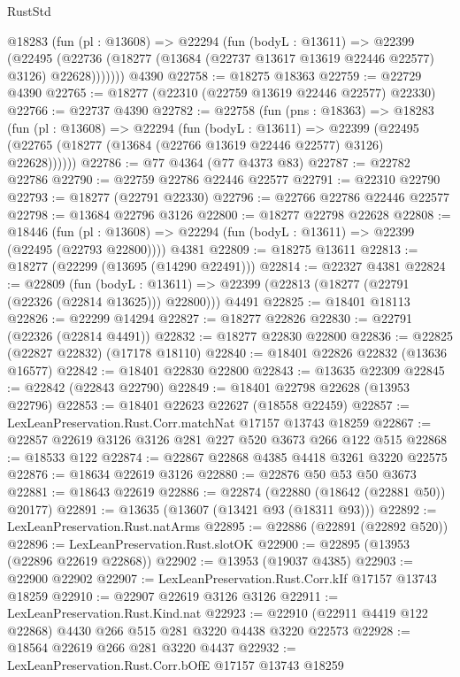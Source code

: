 \begin{lexlean}{RustStd}
\begin{coremodule}
      @18283
        (fun (pl : @13608) =>
        @22294
          (fun (bodyL : @13611) =>
          @22399
            (@22495
              (@22736 (@18277 (@13684 (@22737 @13617 @13619 @22446 @22577) @3126) @22628)))))))
    @4390
@22758 := @18275 @18363
@22759 := @22729 @4390
@22765 := @18277 (@22310 (@22759 @13619 @22446 @22577) @22330)
@22766 := @22737 @4390
@22782 := @22758
    (fun (pns : @18363) =>
    @18283
      (fun (pl : @13608) =>
      @22294
        (fun (bodyL : @13611) =>
        @22399 (@22495 (@22765 (@18277 (@13684 (@22766 @13619 @22446 @22577) @3126) @22628))))))
@22786 := @77 @4364 (@77 @4373 @83)
@22787 := @22782 @22786
@22790 := @22759 @22786 @22446 @22577
@22791 := @22310 @22790
@22793 := @18277 (@22791 @22330)
@22796 := @22766 @22786 @22446 @22577
@22798 := @13684 @22796 @3126
@22800 := @18277 @22798 @22628
@22808 := @18446
    (fun (pl : @13608) => @22294 (fun (bodyL : @13611) => @22399 (@22495 (@22793 @22800))))
    @4381
@22809 := @18275 @13611
@22813 := @18277 (@22299 (@13695 (@14290 @22491)))
@22814 := @22327 @4381
@22824 := @22809
    (fun (bodyL : @13611) => @22399 (@22813 (@18277 (@22791 (@22326 (@22814 @13625))) @22800)))
    @4491
@22825 := @18401 @18113
@22826 := @22299 @14294
@22827 := @18277 @22826
@22830 := @22791 (@22326 (@22814 @4491))
@22832 := @18277 @22830 @22800
@22836 := @22825 (@22827 @22832) (@17178 @18110)
@22840 := @18401 @22826 @22832 (@13636 @16577)
@22842 := @18401 @22830 @22800
@22843 := @13635 @22309
@22845 := @22842 (@22843 @22790)
@22849 := @18401 @22798 @22628 (@13953 @22796)
@22853 := @18401 @22623 @22627 (@18558 @22459)
@22857 := LexLeanPreservation.Rust.Corr.matchNat @17157 @13743 @18259
@22867 := @22857 @22619 @3126 @3126 @281 @227 @520 @3673 @266 @122 @515
@22868 := @18533 @122
@22874 := @22867 @22868 @4385 @4418 @3261 @3220 @22575
@22876 := @18634 @22619 @3126
@22880 := @22876 @50 @53 @50 @3673
@22881 := @18643 @22619
@22886 := @22874 (@22880 (@18642 (@22881 @50)) @20177)
@22891 := @13635 (@13607 (@13421 @93 (@18311 @93)))
@22892 := LexLeanPreservation.Rust.natArms
@22895 := @22886 (@22891 (@22892 @520))
@22896 := LexLeanPreservation.Rust.slotOK
@22900 := @22895 (@13953 (@22896 @22619 @22868))
@22902 := @13953 (@19037 @4385)
@22903 := @22900 @22902
@22907 := LexLeanPreservation.Rust.Corr.kIf @17157 @13743 @18259
@22910 := @22907 @22619 @3126 @3126
@22911 := LexLeanPreservation.Rust.Kind.nat
@22923 := @22910 (@22911 @4419 @122 @22868) @4430 @266 @515 @281 @3220 @4438 @3220 @22573
@22928 := @18564 @22619 @266 @281 @3220 @4437
@22932 := LexLeanPreservation.Rust.Corr.bOfE @17157 @13743 @18259

\end{coremodule}
\end{lexlean}
